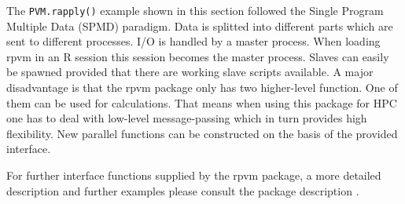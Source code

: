The \texttt{PVM.rapply()} example shown in this section followed the Single Program
Multiple Data (SPMD) paradigm. Data is splitted into different parts
which are sent to different processes. I/O is handled by a master
process. When loading rpvm in an R session this session becomes the
master process. Slaves can easily be spawned provided that there are
working slave scripts available. A major disadvantage is that the rpvm
package only has two higher-level function. One of them can be used
for calculations. That means when using this package for HPC one has
to deal with low-level message-passing which in turn provides high
flexibility. New parallel functions can be constructed on the basis of
the provided interface.

For further interface functions supplied by the rpvm package, a more detailed
description and further examples please consult the package description
\cite{nali07rpvm}.
